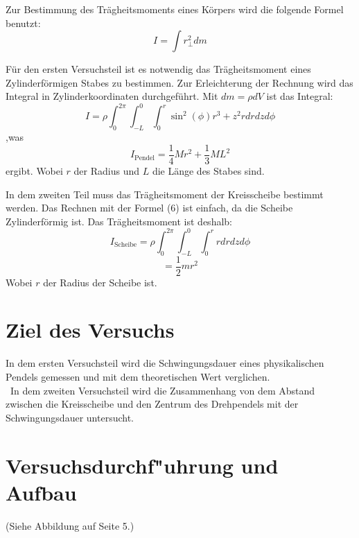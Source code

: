\documentclass[11pt,a4paper]{article} %
\begin{document}
Zur Bestimmung des Trägheitsmoments eines Körpers wird die folgende Formel benutzt:
\begin{equation}
I = \int r_\perp^2 dm
\end{equation}

Für den ersten Versuchsteil ist es notwendig das Trägheitsmoment eines Zylinderförmigen Stabes zu bestimmen. Zur Erleichterung der Rechnung wird das Integral in Zylinderkoordinaten durchgeführt. Mit $dm = \rho dV$ ist das Integral:
$$I = \rho \int_{0}^{2\pi} \int_{-L}^{0} \int_{0}^{r} \sin^2(\phi)r^3 + z^2r dr dz d\phi$$ 
,was 
\begin{equation}
I_\textrm{Pendel} = \frac{1}{4}Mr^2 +\frac{1}{3}ML^2
\end{equation}
ergibt. Wobei $r$ der Radius und $L$ die Länge des Stabes sind. 

In dem zweiten Teil muss das Trägheitsmoment der Kreisscheibe bestimmt werden. Das Rechnen mit der Formel (6) ist einfach, da die Scheibe Zylinderförmig ist. Das Trägheitsmoment ist deshalb:
$$ I_\textrm{Scheibe} = \rho \int_{0}^{2\pi} \int_{-L}^{0} \int_{0}^{r} r dr dz d\phi $$
\begin{equation}
= \frac{1}{2}mr^2
\end{equation}
Wobei $r$ der Radius der Scheibe ist. 
\section{Ziel des Versuchs}
In dem ersten Versuchsteil wird die Schwingungsdauer eines physikalischen Pendels gemessen und mit dem theoretischen Wert verglichen. 
\\\
In dem zweiten Versuchsteil wird die Zusammenhang von dem Abstand zwischen die Kreisscheibe und den Zentrum des Drehpendels mit der Schwingungsdauer untersucht. 

\section{Versuchsdurchf"uhrung und Aufbau}
(Siehe Abbildung auf Seite 5.)

 
\end{document}
